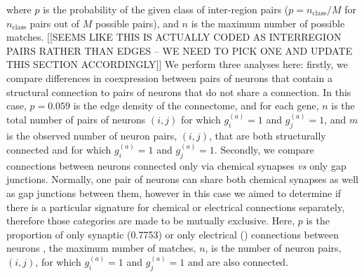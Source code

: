 \documentclass[10pt,letterpaper]{article}
\begin{document}
where $p$ is the probability of the given class of inter-region pairs ($p = n_\mathrm{class}/M$ for $n_\mathrm{class}$ pairs out of $M$ possible pairs), and $n$ is the maximum number of possible matches.
[[SEEMS LIKE THIS IS ACTUALLY CODED AS INTERREGION PAIRS RATHER THAN EDGES -- WE NEED TO PICK ONE AND UPDATE THIS SECTION ACCORDINGLY]]
We perform three analyses here: firstly, we compare differences in coexpression between pairs of neurons that contain a structural connection to pairs of neurons that do not share a connection.
In this case, $p = 0.059$ is the edge density of the connectome, and for each gene, $n$ is the total number of pairs of neurons $(i,j)$ for which $g^{(a)}_i = 1$ and $g^{(a)}_j = 1$, and $m$ is the observed number of neuron pairs, $(i,j)$, that are both structurally connected and for which $g^{(a)}_i = 1$ and $g^{(a)}_j = 1$.
Secondly, we compare connections between neurons connected only via chemical synapses \textit{vs} only gap junctions.
Normally, one pair of neurons can share both chemical synapses as well as gap junctions between them, however in this case we aimed to determine if there is a particular signature for chemical or electrical connections separately, therefore those categories are made to be mutually exclusive.
Here, $p$ is the proportion of only synaptic (0.7753) or only electrical () connections between neurons , the maximum number of matches, $n$, is the number of neuron pairs, $(i,j)$, for which $g^{(a)}_i = 1$ and $g^{(a)}_j = 1$ and are also connected.
\end{document}
